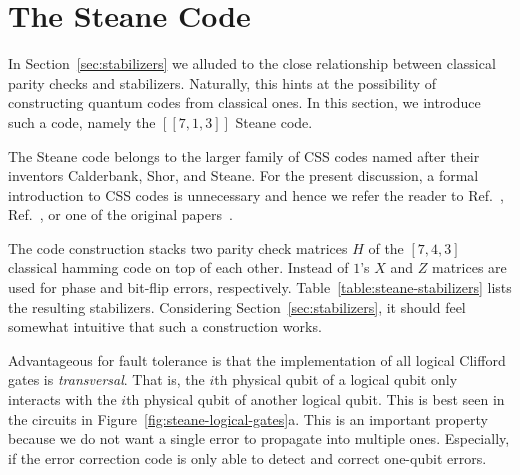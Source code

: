 

\section{The Steane Code}\label{sec:steane-code}

In Section~\ref{sec:stabilizers} we alluded to the close relationship between classical parity checks and stabilizers. Naturally, this hints at the possibility of constructing quantum codes from classical ones. In this section, we introduce such a code, namely the $[[7,1,3]]$ Steane code.

The Steane code belongs to the larger family of CSS codes named after their inventors Calderbank, Shor, and Steane. For the present discussion, a formal introduction to CSS codes is unnecessary and hence we refer the reader to Ref.~\cite{nielsen00}, Ref.~\cite{gottesman_introduction_2009}, or one of the original papers~\cite{calderbank_good_1996}. 

\noindent
The code construction stacks two parity check matrices $H$ of the $[7,4,3]$ classical hamming code on top of each other. Instead of $1$'s $X$ and $Z$ matrices are used for phase and bit-flip errors, respectively. Table~\ref{table:steane-stabilizers} lists the resulting stabilizers. Considering Section~\ref{sec:stabilizers}, it should feel somewhat intuitive that such a construction works.

Advantageous for fault tolerance is that the implementation of all logical Clifford gates is \textit{transversal}. That is, the $i$th physical qubit of a logical qubit only interacts with the $i$th physical qubit of another logical qubit. This is best seen in the circuits in Figure~\ref{fig:steane-logical-gates}a. This is an important property because we do not want a single error to propagate into multiple ones. Especially, if the error correction code is only able to detect and correct one-qubit errors. 

\begin{table}[h]
    \centering
    \caption{The stabilizers of the 7-Qubit Steane code.}\label{table:steane-stabilizers}
\end{table}

